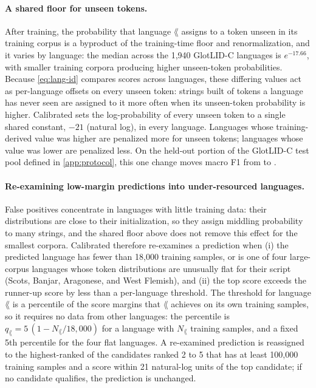 \paragraph{A shared floor for unseen tokens.} After training, the probability
that language $\lang$ assigns to a token unseen in its training corpus is a
byproduct of the training-time floor and renormalization, and it varies by
language: the median across the 1,940 GlotLID-C languages is $e^{-17.66}$,
with smaller training corpora producing higher unseen-token probabilities.
Because \cref{eq:lang-id} compares scores across languages, these differing
values act as per-language offsets on every unseen token: strings built of
tokens a language has never seen are assigned to it more often when its
unseen-token probability is higher. Calibrated \unilid sets the
log-probability of every unseen token
to a single shared constant, $-21$ (natural log), in every language. Languages
whose training-derived value was higher are penalized more for unseen tokens;
languages whose value was lower are penalized less. On the held-out portion of
the GlotLID-C test pool defined in \cref{app:protocol}, this one change moves
macro F1 from  to
.

\paragraph{Re-examining low-margin predictions into under-resourced
languages.} False positives concentrate in languages with little training
data: their distributions are close to their initialization, so they assign
middling probability to many strings, and the shared floor above does not
remove this effect for the smallest corpora. Calibrated \unilid therefore
re-examines a prediction when (i) the predicted language has fewer than
18{,}000 training samples, or is one of four large-corpus languages whose
token distributions are unusually flat for their script (Scots, Banjar,
Aragonese, and West Flemish), and (ii) the top score exceeds the runner-up
score by less than a per-language threshold. The threshold for language
$\lang$ is a percentile of the score margins that $\lang$ achieves on its own
training samples, so it requires no data from other languages: the percentile
is $q_\lang = 5\,(1 - N_\lang/18{,}000)$ for a language with $N_\lang$
training samples, and a fixed 5th percentile for the four flat languages. A
re-examined prediction is reassigned to the highest-ranked of the candidates
ranked 2 to 5 that has at least 100{,}000 training samples and a score within
21 natural-log units of the top candidate; if no candidate qualifies, the
prediction is unchanged.


